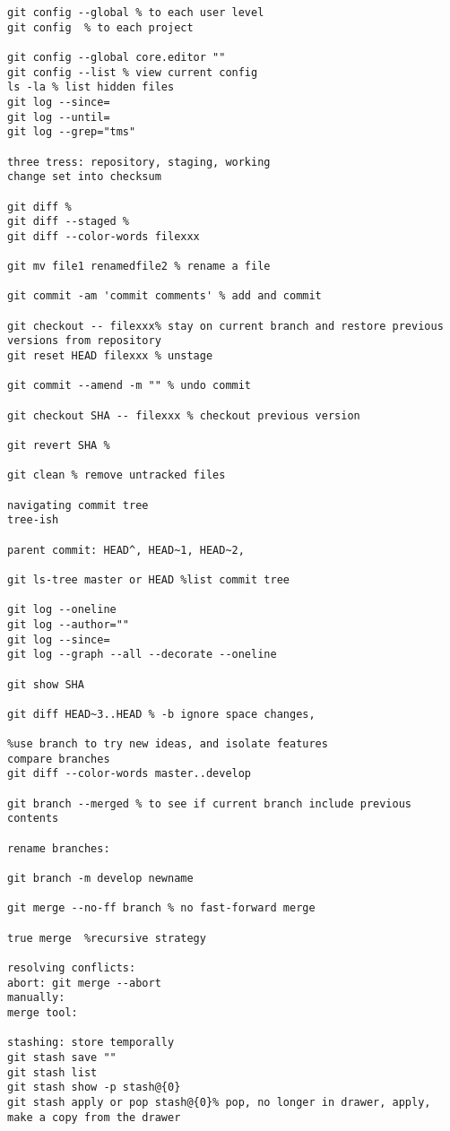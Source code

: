 \documentclass[12pt,letterpaper]{article}
\begin{document}
\begin{lstlisting}
git config --global % to each user level
git config  % to each project

git config --global core.editor ""
git config --list % view current config
ls -la % list hidden files
git log --since=
git log --until=
git log --grep="tms"

three tress: repository, staging, working
change set into checksum

git diff %
git diff --staged %
git diff --color-words filexxx

git mv file1 renamedfile2 % rename a file

git commit -am 'commit comments' % add and commit

git checkout -- filexxx% stay on current branch and restore previous versions from repository
git reset HEAD filexxx % unstage

git commit --amend -m "" % undo commit

git checkout SHA -- filexxx % checkout previous version

git revert SHA %

git clean % remove untracked files 

navigating commit tree
tree-ish 

parent commit: HEAD^, HEAD~1, HEAD~2,

git ls-tree master or HEAD %list commit tree 

git log --oneline 
git log --author=""
git log --since=
git log --graph --all --decorate --oneline

git show SHA 

git diff HEAD~3..HEAD % -b ignore space changes, 

%use branch to try new ideas, and isolate features
compare branches
git diff --color-words master..develop  

git branch --merged % to see if current branch include previous contents 

rename branches: 

git branch -m develop newname 

git merge --no-ff branch % no fast-forward merge

true merge  %recursive strategy

resolving conflicts: 
abort: git merge --abort
manually: 
merge tool: 

stashing: store temporally 
git stash save ""
git stash list 
git stash show -p stash@{0}
git stash apply or pop stash@{0}% pop, no longer in drawer, apply, make a copy from the drawer


\end{lstlisting}
\end{document}
